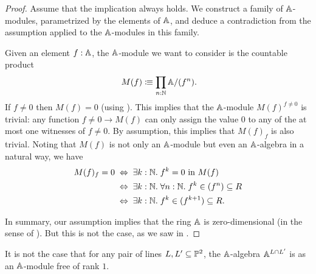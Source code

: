 \begin{proof}
  Assume that the implication always holds.
  We construct a family of $\mathbb{A}$-modules,
  parametrized by the elements of $\mathbb{A}$,
  and deduce a contradiction from the assumption
  applied to the $\mathbb{A}$-modules in this family.

  Given an element $f : \mathbb{A}$,
  the $\mathbb{A}$-module we want to consider is
  the countable product
  \[ M(f) \colonequiv \prod_{n : \N} \A/(f^n) \rlap{.} \]
  If $f \neq 0$ then $M(f) = 0$
  (using ).
  This implies that the $\mathbb{A}$-module $M(f)^{f \neq 0}$
  is trivial:
  any function $f \neq 0 \to M(f)$ can only assign the value $0$
  to any of the at most one witnesses of $f \neq 0$.
  By assumption, this implies that $M(f)_f$ is also trivial.
  Noting that
  $M(f)$ is not only an $\mathbb{A}$-module
  but even an $\mathbb{A}$-algebra in a natural way,
  we have
  \begin{align*}
    M(f)_f = 0
    &\;\Leftrightarrow\;
    \exists k : \N.\; \text{$f^k = 0$ in $M(f)$} \\
    &\;\Leftrightarrow\;
    \exists k : \N.\; \forall n : \N.\; f^k \in (f^n) \subseteq R \\
    &\;\Leftrightarrow\;
    \exists k : \N.\; f^k \in (f^{k + 1}) \subseteq R
    \rlap{.}
  \end{align*}

  In summary,
  our assumption implies that the ring $\mathbb{A}$ is zero-dimensional
  (in the sense of ).
  But this is not the case,
  as we saw in .
\end{proof}

\begin{example}
  It is not the case that
  for any pair of lines $L, L' \subseteq \mathbb{P}^2$,
  the $\mathbb{A}$-algebra $\mathbb{A}^{L \cap L'}$ is
  as an $\mathbb{A}$-module free of rank $1$.
\end{example}

